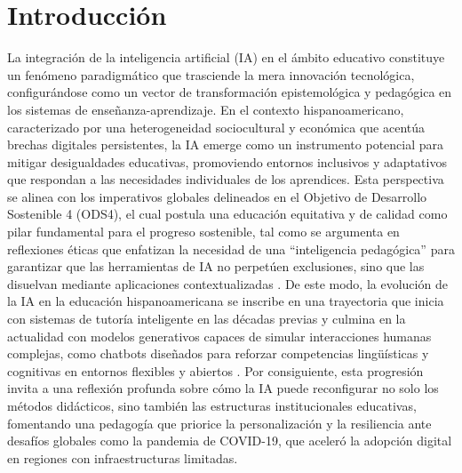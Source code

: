 \documentclass[spanish]{textolivre}
\begin{document}
\section{Introducción}\label{sec-intro}
La integración de la inteligencia artificial (IA) en el ámbito educativo constituye un fenómeno paradigmático que trasciende la mera innovación tecnológica, configurándose como un vector de transformación epistemológica y pedagógica en los sistemas de enseñanza-aprendizaje. En el contexto hispanoamericano, caracterizado por una heterogeneidad sociocultural y económica que acentúa brechas digitales persistentes, la IA emerge como un instrumento potencial para mitigar desigualdades educativas, promoviendo entornos inclusivos y adaptativos que respondan a las necesidades individuales de los aprendices. Esta perspectiva se alinea con los imperativos globales delineados en el Objetivo de Desarrollo Sostenible 4 (ODS4), el cual postula una educación equitativa y de calidad como pilar fundamental para el progreso sostenible, tal como se argumenta en reflexiones éticas que enfatizan la necesidad de una ``inteligencia pedagógica'' para garantizar que las herramientas de IA no perpetúen exclusiones, sino que las disuelvan mediante aplicaciones contextualizadas \cite{floresvivar2023}. De este modo, la evolución de la IA en la educación hispanoamericana se inscribe en una trayectoria que inicia con sistemas de tutoría inteligente en las décadas previas y culmina en la actualidad con modelos generativos capaces de simular interacciones humanas complejas, como chatbots diseñados para reforzar competencias lingüísticas y cognitivas en entornos flexibles y abiertos \cite{vazquezcano2021}. Por consiguiente, esta progresión invita a una reflexión profunda sobre cómo la IA puede reconfigurar no solo los métodos didácticos, sino también las estructuras institucionales educativas, fomentando una pedagogía que priorice la personalización y la resiliencia ante desafíos globales como la pandemia de COVID-19, que aceleró la adopción digital en regiones con infraestructuras limitadas.
\end{document}
